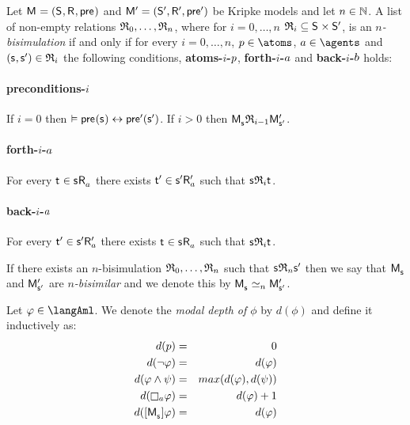 \begin{definition}[$n$-bisimulation]
Let $\aModelAndTuple$ and $\aModelAndTupleP$ be Kripke models and let $n \in \mathbb{N}$.
A list of non-empty relations $\mathfrak{R}_0, \dots, \mathfrak{R}_n$, where for $i = 0, \dots, n$ $\bisimulation_i \subseteq \aStates \times \aStatesP$, is an {\em $n$-bisimulation} if and only if for every $i = 0, \dots, n$, $\atomP \in \atoms$, $\agentA \in \agents$ and $(\aStateS, \aStateSP) \in \bisimulation_i$ the following conditions, {\bf atoms-$i$-$p$}, {\bf forth-$i$-$a$} and {\bf back-$i$-$b$} holds:

\paragraph{preconditions-$i$}
If $i = 0$ then $\entails \aPrecondition(\aStateS) \iff \aPreconditionP(\aStateSP)$.
If $i > 0$ then $\aPModel{\aStateS} \bisimulation_{i-1} \aPModelP{\aStateSP}$.

\paragraph{forth-$i$-$a$}
For every $\aStateT \in \aSuccessorsA{\aStateS}$ there exists ${\mathsf{{t}}^{\prime}} \in {{\mathsf{{s}}^{\prime}}} {\mathsf{R}^{\prime}_{a}}$ such that $\aStateS \bisimulation_i \aStateT$.

\paragraph{back-$i$-$a$}
For every ${\mathsf{{t}}^{\prime}} \in {{\mathsf{{s}}^{\prime}}} {\mathsf{R}^{\prime}_{a}}$ there exists $\aStateT \in \aSuccessorsA{\aStateS}$ such that $\aStateS \bisimulation_i \aStateT$.

If there exists an $n$-bisimulation $\mathfrak{R}_0, \dots, \mathfrak{R}_n$ such that $\aStateS \bisimulation_n \aStateSP$ then we say that $\aPModel{\aStateS}$ and ${\mathsf{M}^{\prime}_{{\mathsf{{s}}^{\prime}}}}$ are {\em $n$-bisimilar} and we denote this by $\aPModel{\aStateS} \bisimilar[n] \aPModelP{\aStateSP}$.
\end{definition}

\begin{definition}
Let $\phi \in \langAml$.
We denote the {\em modal depth of $\phi$} by $d(\phi)$ and define it inductively as:
\begin{eqnarray*}
    d(\atomP) &=& 0\\
    d(\lnot \phi) &=& d(\phi)\\
    d(\phi \land \psi) &=& max(d(\phi), d(\psi))\\
    d(\necessaryA \phi) &=& d(\phi) + 1\\
    d(\actionA{\aPModel{\aStateS}} \phi) &=& d(\phi)
\end{eqnarray*}
\end{definition}


